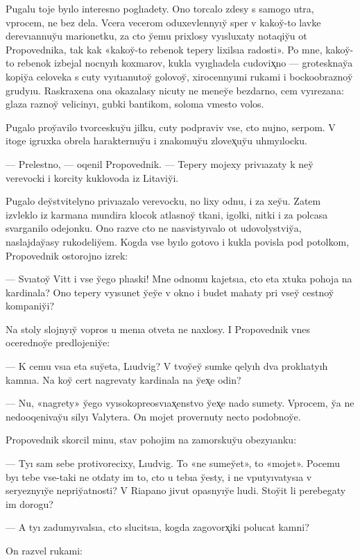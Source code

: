 \documentclass[10pt]{book}
\begin{document}
Pugalu toje byılo interesno poglıadety. Ono torcalo zdesy s samogo utra, vprocem, ne bez dela. Vcera vecerom oduxevlennyıy̆ sper v kakoy̆-to lavke derevıannuy̆u marionetku, za cto y̆emu prixlosy vyısluxaty notaqiy̆u ot Propovednika, tak kak «kakoy̆-to rebenok tepery lixilsıa radosti». Po mne, kakoy̆-to rebenok izbejal nocnyıh koxmarov, kukla vyıglıadela cudovix̨no — grotesknay̆a kopiy̆a celoveka s cuty vyıtıanutoy̆ golovoy̆, xirocennyımi rukami i bockoobraznoy̆ grudyıu. Raskraxena ona okazalasy nicuty ne meney̆e bezdarno, cem vyırezana: glaza raznoy̆ velicinyı, gubki bantikom, soloma vmesto volos.

Pugalo proy̆avilo tvorceskuy̆u jilku, cuty podpraviv vse, cto nujno, serpom. V itoge igruxka obrela harakternuy̆u i znakomuy̆u zlovex̨uy̆u uhmyılocku.

— Prelestno, — oqenil Propovednik. — Tepery mojexy privıazaty k ney̆ verevocki i korcity kuklovoda iz Litaviy̆i.

Pugalo dey̆stvitelyno privıazalo verevocku, no lixy odnu, i za xey̆u. Zatem izvleklo iz karmana mundira klocok atlasnoy̆ tkani, igolki, nitki i za polcasa svarganilo odejonku. Ono razve cto ne nasvistyıvalo ot udovolystviy̆a, naslajday̆asy rukodeliy̆em. Kogda vse byılo gotovo i kukla povisla pod potolkom, Propovednik ostorojno izrek:

— Svıatoy̆ Vitt i vse y̆ego plıaski! Mne odnomu kajetsıa, cto eta xtuka pohoja na kardinala? Ono tepery vyısunet y̆ey̆e v okno i budet mahaty pri vsey̆ cestnoy̆ kompaniy̆i?

Na stoly slojnyıy̆ vopros u menıa otveta ne naxlosy. I Propovednik vnes ocerednoy̆e predlojeniy̆e:

— K cemu vsıa eta suy̆eta, Lıudvig? V tvoy̆ey̆ sumke qelyıh dva proklıatyıh kamnıa. Na koy̆ cert nagrevaty kardinala na y̆ex̨e odin?

— Nu, «nagrety» y̆ego vyısokopreosvıax̨enstvo y̆ex̨e nado sumety. Vprocem, y̆a ne nedooqenivay̆u silyı Valytera. On mojet provernuty necto podobnoy̆e.

Propovednik skorcil minu, stav pohojim na zamorskuy̆u obezyıanku:

— Tyı sam sebe protivorecixy, Lıudvig. To «ne sumey̆et», to «mojet». Pocemu byı tebe vse-taki ne otdaty im to, cto u tebıa y̆esty, i ne vputyıvatysıa v seryeznyıy̆e nepriy̆atnosti? V Riapano jivut opasnyıy̆e lıudi. Stoy̆it li perebegaty im dorogu?

— A tyı zadumyıvalsıa, cto slucitsıa, kogda zagovorx̨iki polucat kamni?

On razvel rukami:
\end{document}

